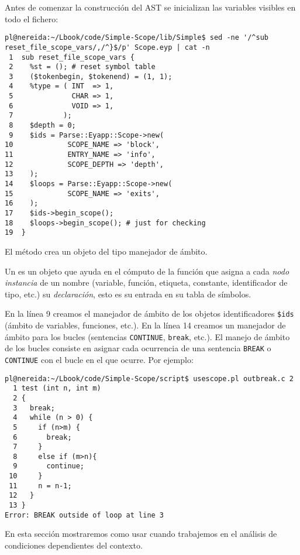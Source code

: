 Antes de comenzar la construcción del AST se inicializan las variables visibles
en todo el fichero:

\begin{verbatim}
pl@nereida:~/Lbook/code/Simple-Scope/lib/Simple$ sed -ne '/^sub reset_file_scope_vars/,/^}$/p' Scope.eyp | cat -n
 1  sub reset_file_scope_vars {
 2    %st = (); # reset symbol table
 3    ($tokenbegin, $tokenend) = (1, 1);
 4    %type = ( INT  => 1,
 5              CHAR => 1,
 6              VOID => 1,
 7            );
 8    $depth = 0;
 9    $ids = Parse::Eyapp::Scope->new(
10             SCOPE_NAME => 'block',
11             ENTRY_NAME => 'info',
12             SCOPE_DEPTH => 'depth',
13    );
14    $loops = Parse::Eyapp::Scope->new(
15             SCOPE_NAME => 'exits',
16    );
17    $ids->begin_scope();
18    $loops->begin_scope(); # just for checking
19  }
\end{verbatim}


El método  
crea un objeto del tipo manejador de ámbito. 

Un  es un objeto que ayuda en el cómputo de la función que asigna 
a cada \emph{nodo instancia} de un nombre (variable, función, etiqueta, constante, identificador de tipo,
etc.)
su \emph{declaración}, esto es su entrada en su tabla de símbolos.

En la línea 9 creamos el manejador de ámbito
de los objetos identificadores \verb|$ids| (ámbito de variables, funciones, etc.). 
En la línea 14 creamos un manejador de ámbito para los bucles (sentencias \verb|CONTINUE|, \verb|break|, etc.).
El manejo de ámbito de los bucles consiste en asignar cada ocurrencia de una 
sentencia \verb|BREAK| o \verb|CONTINUE| con el bucle en el que ocurre. Por ejemplo:

\begin{verbatim}
pl@nereida:~/Lbook/code/Simple-Scope/script$ usescope.pl outbreak.c 2
  1 test (int n, int m)
  2 {
  3   break;
  4   while (n > 0) {
  5     if (n>m) {
  6       break;
  7     }
  8     else if (m>n){
  9       continue;
 10     }
 11     n = n-1;
 12   }
 13 }
Error: BREAK outside of loop at line 3
\end{verbatim}
En esta sección mostraremos como usar 
cuando trabajemos en el análisis de condiciones
dependientes del contexto.


